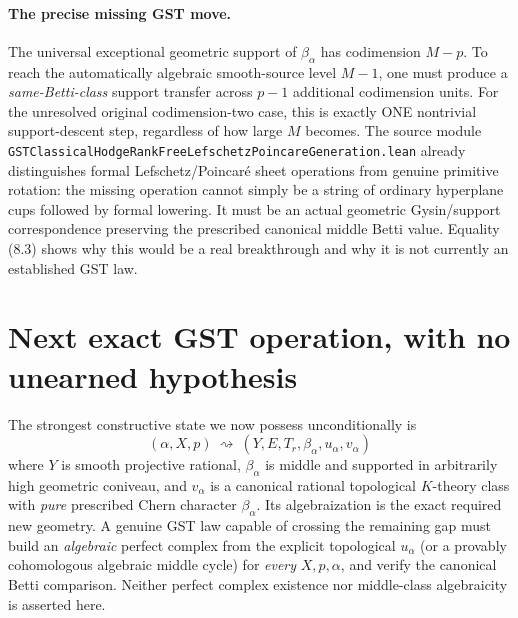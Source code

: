 \documentclass[11pt]{article}
\begin{document}
\paragraph{The precise missing GST move.}
The universal exceptional geometric
support of \(\beta_\alpha\)
has codimension \(M-p\).
To reach the automatically
algebraic smooth-source level
\(M-1\), one must produce a
\emph{same-Betti-class}
support transfer across \(p-1\)
additional codimension units.
For the unresolved original
codimension-two case, this
is exactly ONE nontrivial
support-descent step, regardless
of how large \(M\) becomes.
The source module
\texttt{GSTClassicalHodgeRankFreeLefschetzPoincareGeneration.lean}
already distinguishes formal
Lefschetz/Poincaré sheet operations
from genuine primitive rotation:
the missing operation cannot
simply be a string of ordinary
hyperplane cups followed by
formal lowering. It must be
an actual geometric Gysin/support
correspondence preserving the
prescribed canonical middle
Betti value. Equality (8.3)
shows why this would be a real
breakthrough and why it is not
currently an established GST law.

\section{Next exact GST operation, with no unearned hypothesis}
The strongest constructive state we
now possess unconditionally is
\[
 (\alpha,X,p)\ \rightsquigarrow\
 (Y,E,T_r,\beta_\alpha,u_\alpha,v_\alpha)
\]
where \(Y\) is smooth projective rational,
\(\beta_\alpha\) is middle and supported
in arbitrarily high geometric coniveau,
and \(v_\alpha\) is a canonical
rational topological \(K\)-theory class
with \emph{pure} prescribed Chern
character \(\beta_\alpha\).
Its algebraization is the exact
required new geometry. A genuine GST
law capable of crossing the remaining
gap must build an \emph{algebraic}
perfect complex from the explicit
topological \(u_\alpha\) (or a
provably cohomologous algebraic
middle cycle) for \emph{every}
\(X,p,\alpha\), and verify the canonical
Betti comparison. Neither perfect
complex existence nor middle-class
algebraicity is asserted here.
\end{document}
